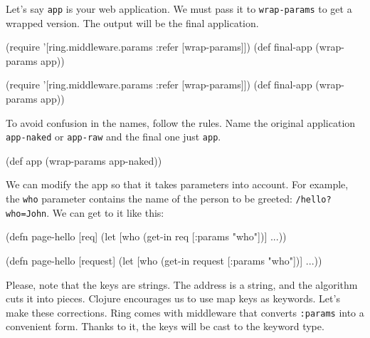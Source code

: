 Let's say \verb|app| is your web application. We must pass it to \verb|wrap-params| to get a wrapped version. The output will be the final application.


\ifx\DEVICETYPE\MOBILE

\begin{clojure}
(require '[ring.middleware.params
           :refer [wrap-params]])
(def final-app (wrap-params app))
\end{clojure}

\else

\begin{clojure}
(require '[ring.middleware.params :refer [wrap-params]])
(def final-app (wrap-params app))
\end{clojure}

\fi

To avoid confusion in the names, follow the rules. Name the original application \verb|app-naked| or \verb|app-raw| and the final one just \verb|app|.

\begin{clojure}
(def app (wrap-params app-naked))
\end{clojure}

We can modify the app so that it takes parameters into account. For example, the \verb|who| parameter contains the name of the person to be greeted:
\verb|/hello?who=John|. We can get to it like this:

\ifx\DEVICETYPE\MOBILE

\begin{clojure}
(defn page-hello [req]
  (let [who (get-in req [:params "who"])]
    ...))
\end{clojure}

\else

\begin{clojure}
(defn page-hello [request]
  (let [who (get-in request [:params "who"])]
    ...))
\end{clojure}

\fi


Please, note that the keys are strings. The address is a string, and the algorithm cuts it into pieces. Clojure encourages us to use map keys as keywords. Let's make these corrections. Ring comes with middleware that converts \verb|:params| into a convenient form. Thanks to it, the keys will be cast to the keyword type.


